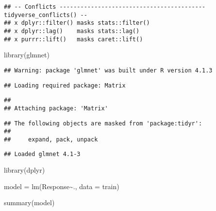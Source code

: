 \documentclass[
]{article}
\newenvironment{Shaded}{\begin{snugshade}}{\end{snugshade}}
\newcommand{\AttributeTok}[1]{\textcolor[rgb]{0.77,0.63,0.00}{#1}}
\newcommand{\FunctionTok}[1]{\textcolor[rgb]{0.00,0.00,0.00}{#1}}
\newcommand{\NormalTok}[1]{#1}
\newcommand{\OtherTok}[1]{\textcolor[rgb]{0.56,0.35,0.01}{#1}}
\newcommand{\SpecialCharTok}[1]{\textcolor[rgb]{0.00,0.00,0.00}{#1}}
\begin{document}
\begin{verbatim}
## -- Conflicts ------------------------------------------ tidyverse_conflicts() --
## x dplyr::filter() masks stats::filter()
## x dplyr::lag()    masks stats::lag()
## x purrr::lift()   masks caret::lift()
\end{verbatim}

\begin{Shaded}
\begin{Highlighting}[]
\FunctionTok{library}\NormalTok{(glmnet)}
\end{Highlighting}
\end{Shaded}

\begin{verbatim}
## Warning: package 'glmnet' was built under R version 4.1.3
\end{verbatim}

\begin{verbatim}
## Loading required package: Matrix
\end{verbatim}

\begin{verbatim}
## 
## Attaching package: 'Matrix'
\end{verbatim}

\begin{verbatim}
## The following objects are masked from 'package:tidyr':
## 
##     expand, pack, unpack
\end{verbatim}

\begin{verbatim}
## Loaded glmnet 4.1-3
\end{verbatim}

\begin{Shaded}
\begin{Highlighting}[]
\FunctionTok{library}\NormalTok{(dplyr)}
\end{Highlighting}
\end{Shaded}

\begin{Shaded}
\begin{Highlighting}[]
\NormalTok{model }\OtherTok{=} \FunctionTok{lm}\NormalTok{(Response}\SpecialCharTok{\textasciitilde{}}\NormalTok{., }\AttributeTok{data =}\NormalTok{ train)}

\FunctionTok{summary}\NormalTok{(model)}
\end{Highlighting}
\end{Shaded}
\end{document}

